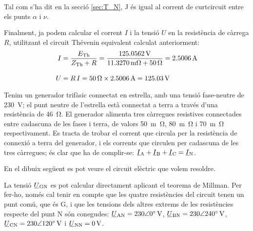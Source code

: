\begin{exemple}
    Tal com s'ha dit en la secció \ref{sec:T_N}, J és igual al
    corrent de curtcircuit entre els punts $\alpha$ i $\nu$.

    Finalment, ja podem calcular el corrent $I$ i la tensió $U$ en la
    resistència de càrrega $R$, utilitzant el circuit Thévenin equivalent calculat anteriorment:
    \begin{align*}
        I &= \frac{E_\mathrm{Th}}{Z_\mathrm{Th} + R} = \frac{\qty{125,0562}{V}}
        {\qty{11,3270}{m\ohm} + \qty{50}{\ohm}} = \qty{2,5006}{A} \\[2ex]
        U &=  R \,I = \qty{50}{\ohm} \times \qty{2,5006}{A} =
        \qty{125,03}{V}
    \end{align*}
\end{exemple}


\begin{exemple}\label{ex:MillmanTrifNeutre}
	\addcontentsxms{\MillmanTrifNeutre}	
    Tenim un generador trifàsic connectat en estrella, amb una tensió fase-neutre de \qty{230}{V}; el punt neutre de l'estrella està connectat a terra a través d'una resistència de \qty{46}{\ohm}. El generador alimenta tres càrregues resistives connectades entre cadascuna de les fases i terra, de valors \qty{50}{m\ohm}, \qty{80}{m\ohm} i \qty{70}{m\ohm} respectivament. Es tracta de trobar el corrent que circula per la resistència de connexió a terra del generador, i els corrents que circulen per cadascuna de les tres càrregues; és clar que ha de complir-se: $\cmplx{I}\ped{A} + \cmplx{I}\ped{B} + \cmplx{I}\ped{C} = \cmplx{I}\ped{N}$.

    En el dibuix  següent es pot veure el circuit elèctric que  volem resoldre.

	 \begin{center}
		
	\end{center}

    La tensió $\cmplx{U}\ped{GN}$ es pot calcular directament aplicant el teorema de Millman. Per fer-ho, només cal tenir en compte que les quatre resistències del circuit tenen un punt comú, que és G, i que les tensions dels altres extrems de les resistències respecte del punt N són conegudes: $\cmplx{U}\ped{AN}=\complexqty{230:0}{V}$, $\cmplx{U}\ped{BN}=\complexqty{230:240}{V}$, $\cmplx{U}\ped{CN}=\complexqty{230:120}{V}$ i  $\cmplx{U}\ped{NN}=\qty{0}{V}$.


\end{exemple}

